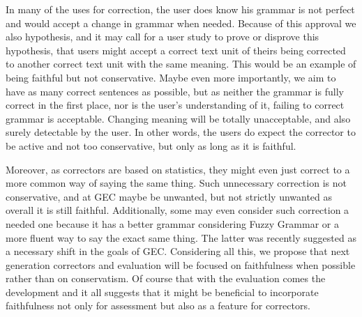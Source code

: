 \documentclass[letter,11pt]{article}
\begin{document}
In many of the uses for correction, the user does know his grammar is not perfect and would accept a change in grammar when needed.
Because of this approval we also hypothesis, and it may call for a user study to prove or disprove this hypothesis, that users might accept a correct text unit of theirs being corrected to another correct text unit with the same meaning.
This would be an example of being faithful but not conservative.
Maybe even more importantly, we aim to have as many correct sentences as possible, but as neither the grammar is fully correct in the first place, nor is the user's understanding of it, failing to correct grammar is acceptable. Changing meaning will be totally unacceptable, and also surely detectable by the user. In other words, the users do expect the corrector to be active and not too conservative, but only as long as it is faithful. 

Moreover, as correctors are based on statistics, they might even
just correct to a more common way of saying the same thing. Such unnecessary
correction is not conservative, and at GEC maybe be unwanted, but not strictly unwanted as overall
it is still faithful. Additionally, some may even
consider such correction a needed one because it has a better grammar considering
Fuzzy Grammar\cite{lakoff1973fuzzy,madnani2011they} or a more fluent
way to say the exact same thing. The latter was recently suggested as a necessary
shift in the goals of GEC\cite{sakaguchi2016reassessing}.
Considering all this, we propose that next generation correctors and evaluation will be focused on faithfulness
when possible rather than on conservatism. Of course that with the evaluation comes the development
and it all suggests that it might be beneficial to incorporate faithfulness not only for assessment
but also as a feature for correctors. 





\end{document}
